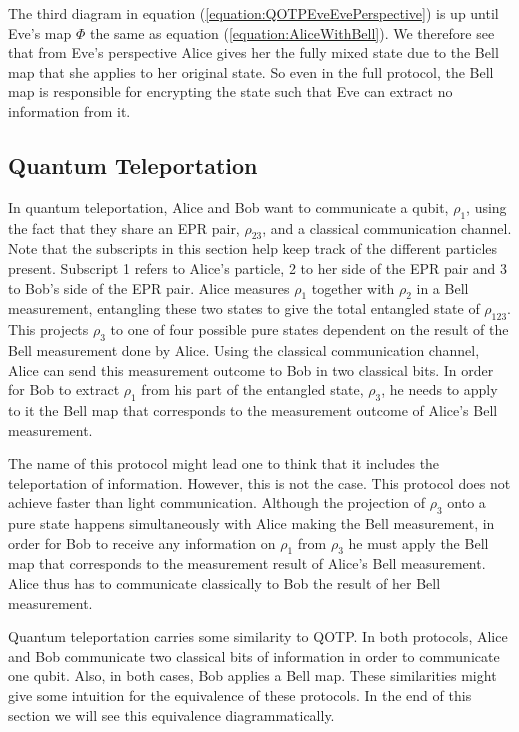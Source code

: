 \documentclass[]{article}
\begin{document}
The third diagram in equation (\ref{equation:QOTPEveEvePerspective}) is up until Eve's map $\Phi$ the same as equation (\ref{equation:AliceWithBell}). We therefore see that from Eve's perspective Alice gives her the fully mixed state due to the Bell map that she applies to her original state. So even in the full protocol, the Bell map is responsible for encrypting the state such that Eve can extract no information from it. 

\subsection{Quantum Teleportation}
\label{subsection:QuantumTeleportation}
In quantum teleportation, Alice and Bob want to communicate a qubit, $\rho_1$, using the fact that they share an EPR pair, $\rho_{23}$, and a classical communication channel. Note that the subscripts in this section help keep track of the different particles present. Subscript 1 refers to Alice's particle, 2 to her side of the EPR pair and 3 to Bob's side of the EPR pair. Alice measures $\rho_1$ together with $\rho_{2}$ in a Bell measurement, entangling these two states to give the total entangled state of $\rho_{123}$. This projects $\rho_{3}$ to one of four possible pure states dependent on the result of the Bell measurement done by Alice. Using the classical communication channel, Alice can send this measurement outcome to Bob in two classical bits. In order for Bob to extract  $\rho_1$ from his part of the entangled state, $\rho_{3}$, he needs to apply to it the Bell map that corresponds to the measurement outcome of Alice's Bell measurement.


The name of this protocol might lead one to think that it includes the teleportation of information. However, this is not the case. This protocol does not achieve faster than light communication. Although the projection of $\rho_{3}$ onto a pure state happens simultaneously with Alice making the Bell measurement, in order for Bob to receive any information on $\rho_1$ from $\rho_{3}$ he must apply the Bell map that corresponds to the measurement result of Alice's Bell measurement. Alice thus has to communicate classically to Bob the result of her Bell measurement.

Quantum teleportation carries some similarity to QOTP. In both protocols, Alice and Bob communicate two classical bits of information in order to communicate one qubit. Also, in both cases, Bob applies a Bell map. These similarities might give some intuition for the equivalence of these protocols. In the end of this section we will see this equivalence diagrammatically.
\end{document}
